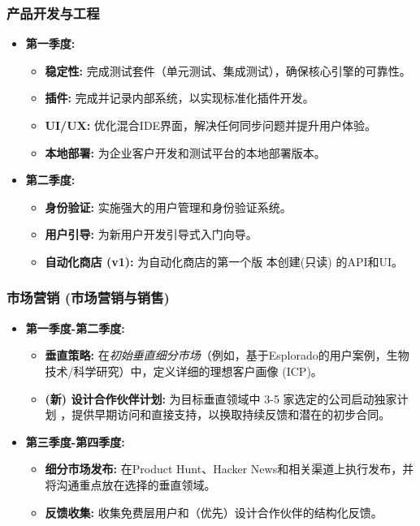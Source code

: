 \documentclass[11点, A4纸, 单面]{article}
\begin{document}
\subsubsection{产品开发与工程}
\begin{itemize}[leftmargin=*]
    \item \textbf{第一季度:}
    \begin{itemize}
        \item \textbf{稳定性:} 完成测试套件（单元测试、集成测试），确保核心引擎的可靠性。
        \item \textbf{插件:} 完成并记录内部系统，以实现标准化插件开发。
        \item \textbf{UI/UX:} 优化混合IDE界面，解决任何同步问题并提升用户体验。
        \item \textbf{本地部署:} 为企业客户开发和测试平台的本地部署版本。
    \end{itemize}
    \item \textbf{第二季度:}
    \begin{itemize}
        \item \textbf{身份验证:} 实施强大的用户管理和身份验证系统。
        \item \textbf{用户引导:} 为新用户开发引导式入门向导。
        \item \textbf{自动化商店 (v1): } 为自动化商店的第一个版 本创建(只读) 的API和UI。
    \end{itemize}
\end{itemize}

\subsubsection{市场营销 (市场营销与销售)}
\begin{itemize}[leftmargin=*]
    \item \textbf{第一季度-第二季度:}
    \begin{itemize}
        \item \textbf{垂直策略:} 在\textit{初始垂直细分市场}（例如，基于Esplorado的用户案例，生物技术/科学研究）中，定义详细的理想客户画像 (ICP)。
        \item \textbf{(新) 设计合作伙伴计划:} 为目标垂直领域中 3-5 家选定的公司启动独家计划
		，提供早期访问和直接支持，以换取持续反馈和潜在的初步合同。
    \end{itemize}
    \item \textbf{第三季度-第四季度:}
    \begin{itemize}
        \item \textbf{细分市场发布:} 在Product Hunt、Hacker News和相关渠道上执行发布，并将沟通重点放在选择的垂直领域。
        \item \textbf{反馈收集:} 收集免费层用户和（优先）设计合作伙伴的结构化反馈。
    \end{itemize}
\end{itemize}
\end{document}
